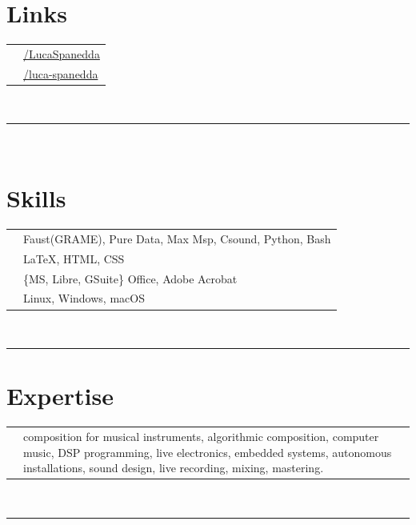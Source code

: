 \documentclass[oneside]{article}
\begin{document}
{\begin{minipage}[t][\textheight-2\fboxsep-2\fboxrule][t]{\dimexpr0.40\textwidth-2\fboxrule-2\fboxsep\relax}
        \section*{\large Links}
        \begin{tabular}{cl}
            \faGithub{}   & \href{https://github.com/LucaSpanedda}{/LucaSpanedda} \\
            \faLinkedin{} & \href{https://www.linkedin.com/in/luca-spanedda/}{/luca-spanedda} \\
        \end{tabular}
        \vspace{10pt} \\
        \rule{\linewidth}{0.2pt} \\
        \section*{\large Skills}
        \begin{tabularx}{\textwidth}{cY}
            \faCode{}        & Faust(GRAME), Pure Data, Max Msp, Csound, Python, Bash \\
            \faPen*{}        & \LaTeX, HTML, CSS \\
            \faFont{}        & \{MS, Libre, GSuite\} Office, Adobe Acrobat \\
            \faCogs{}        & Linux, Windows, macOS \\
        \end{tabularx}
        \vspace{1pt} \\
        \rule{\linewidth}{0.2pt}
        \section*{\large Expertise}
        \begin{tabularx}{\textwidth}{cY}
            \faAngleRight{} & \small composition for musical instruments, algorithmic composition, computer music, DSP
            programming, live electronics, embedded systems, autonomous installations, sound design, live recording,
            mixing, mastering. 
        \end{tabularx}
        \vspace{1pt} \\
        \rule{\linewidth}{0.2pt}

\end{minipage}}
\end{document}

